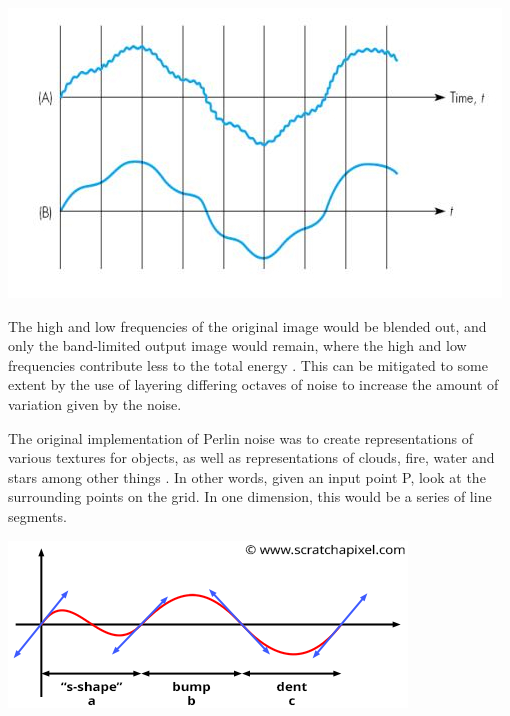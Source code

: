 \documentclass[10pt]{report}
\begin{document}
		\begin{minipage}{\textwidth}
			\centering
			\includegraphics[scale=.5]{bandlimiting-filter}
			\label{fig:bandlimit}
		\end{minipage}
		
		The high and low frequencies of the original image would be blended out, and only the band-limited output image would remain, where the high and low frequencies contribute less to the total energy \cite{making-noise}. This can be mitigated to some extent by the use of layering differing octaves of noise to increase the amount of variation given by the noise. 
		
		The original implementation of Perlin noise was to create representations of various textures for objects, as well as representations of clouds, fire, water and stars among other things \cite{10.1145/325165.325247}. In other words, given an input point P, look at the surrounding points on the grid. In one dimension, this would be a series of line segments. 

		\begin{minipage}{\textwidth}
			\centering
			\includegraphics[scale=.5]{noise-value-vs-perlin3}
			\label{fig:pnoise1d}
		\end{minipage} 
		
\end{document}
